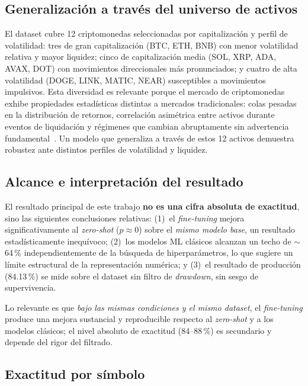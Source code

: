 \documentclass[10pt,twocolumn]{article}
\begin{document}
\subsection{Generalizaci\'on a trav\'es del universo de activos}

El dataset cubre 12 criptomonedas seleccionadas por capitalizaci\'on y perfil de volatilidad: tres de gran capitalizaci\'on (BTC, ETH, BNB) con menor volatilidad relativa y mayor liquidez; cinco de capitalizaci\'on media (SOL, XRP, ADA, AVAX, DOT) con movimientos direccionales m\'as pronunciados; y cuatro de alta volatilidad (DOGE, LINK, MATIC, NEAR) susceptibles a movimientos impulsivos. Esta diversidad es relevante porque el mercado de criptomonedas exhibe propiedades estad\'isticas distintas a mercados tradicionales: colas pesadas en la distribuci\'on de retornos, correlaci\'on asim\'etrica entre activos durante eventos de liquidaci\'on y r\'egimenes que cambian abruptamente sin advertencia fundamental~\cite{bouri2017}. Un modelo que generaliza a trav\'es de estos 12 activos demuestra robustez ante distintos perfiles de volatilidad y liquidez.

\subsection{Alcance e interpretaci\'on del resultado}

El resultado principal de este trabajo \textbf{no es una cifra absoluta de exactitud}, sino las siguientes conclusiones relativas: (1)~el \textit{fine-tuning} mejora significativamente al \textit{zero-shot} ($p\approx0$) sobre el \textit{mismo modelo base}, un resultado estad\'isticamente inequ\'ivoco; (2)~los modelos ML cl\'asicos alcanzan un techo de $\sim$64\,\% independientemente de la b\'usqueda de hiperpar\'ametros, lo que sugiere un l\'imite estructural de la representaci\'on num\'erica; y (3)~el resultado de producci\'on (84.13\,\%) se mide sobre el dataset sin filtro de \textit{drawdown}, sin sesgo de supervivencia.

Lo relevante es que \textit{bajo las mismas condiciones y el mismo dataset}, el \textit{fine-tuning} produce una mejora sustancial y reproducible respecto al \textit{zero-shot} y a los modelos cl\'asicos; el nivel absoluto de exactitud (84--88\,\%) es secundario y depende del rigor del filtrado.

\subsection{Exactitud por s\'imbolo}
\end{document}

